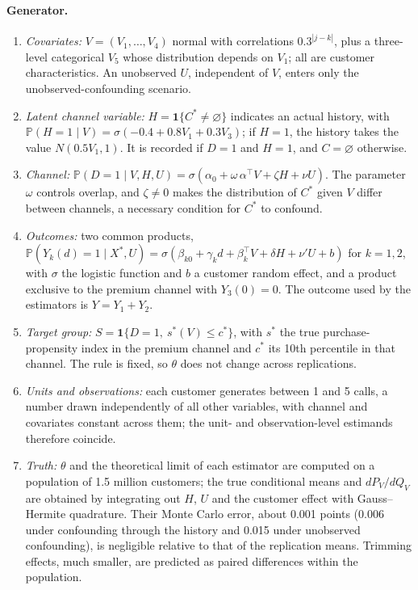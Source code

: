 \documentclass[twoside,11pt]{article}
\newcommand{\PP}{\mathbb{P}}
\newcommand{\ind}{\mathbf{1}}
\newcommand{\vacio}{\varnothing}
\theoremstyle{plain}
\theoremstyle{definition}
\begin{document}
\paragraph{Generator.}
\begin{enumerate}
  \item \emph{Covariates:} $V=(V_1,\dots,V_4)$ normal with correlations $0.3^{|j-k|}$, plus a three-level categorical $V_5$ whose distribution depends on $V_1$; all are customer characteristics. An unobserved $U$, independent of $V$, enters only the unobserved-confounding scenario.
  \item \emph{Latent channel variable:} $H=\ind\{C^*\ne\vacio\}$ indicates an actual history, with $\PP(H=1\mid V)=\sigma(-0.4+0.8V_1+0.3V_3)$; if $H=1$, the history takes the value $N(0.5V_1,1)$. It is recorded if $D=1$ and $H=1$, and $C=\vacio$ otherwise.
  \item \emph{Channel:} $\PP(D=1\mid V,H,U)=\sigma(\alpha_0+\omega\,\alpha^\top V+\zeta H+\nu U)$. The parameter $\omega$ controls overlap, and $\zeta\ne0$ makes the distribution of $C^*$ given $V$ differ between channels, a necessary condition for $C^*$ to confound.
  \item \emph{Outcomes:} two common products, $\PP(Y_k(d)=1\mid X^*,U)=\sigma(\beta_{k0}+\gamma_k d+\beta_k^\top V+\delta H+\nu'U+b)$ for $k=1,2$, with $\sigma$ the logistic function and $b$ a customer random effect, and a product exclusive to the premium channel with $Y_3(0)=0$. The outcome used by the estimators is $Y=Y_1+Y_2$.
  \item \emph{Target group:} $S=\ind\{D=1,\ s^*(V)\le c^*\}$, with $s^*$ the true purchase-propensity index in the premium channel and $c^*$ its 10th percentile in that channel. The rule is fixed, so $\theta$ does not change across replications.
  \item \emph{Units and observations:} each customer generates between 1 and 5 calls, a number drawn independently of all other variables, with channel and covariates constant across them; the unit- and observation-level estimands therefore coincide.
  \item \emph{Truth:} $\theta$ and the theoretical limit of each estimator are computed on a population of 1.5 million customers; the true conditional means and $dP_V/dQ_V$ are obtained by integrating out $H$, $U$ and the customer effect with Gauss--Hermite quadrature. Their Monte Carlo error, about 0.001 points (0.006 under confounding through the history and 0.015 under unobserved confounding), is negligible relative to that of the replication means. Trimming effects, much smaller, are predicted as paired differences within the population.
\end{enumerate}
\end{document}
